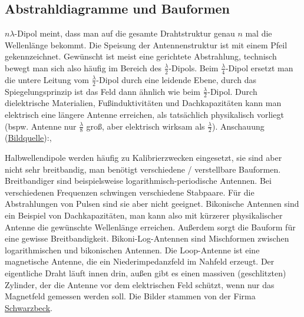  \subsection{Abstrahldiagramme und Bauformen}
  $n\lambda$-Dipol meint, dass man auf die gesamte Drahtstruktur genau $n$ mal die Wellenlänge bekommt. Die Speisung der Antennenstruktur ist mit einem Pfeil gekennzeichnet. Gewünscht ist meist eine gerichtete Abstrahlung, technisch bewegt man sich also häufig im Bereich des $\frac{\lambda}{2}$-Dipols. Beim $\frac{\lambda}{4}$-Dipol ersetzt man die untere Leitung vom $\frac{\lambda}{2}$-Dipol durch eine leidende Ebene, durch das Spiegelungsprinzip ist das Feld dann ähnlich wie beim $\frac{\lambda}{2}$-Dipol. Durch dielektrische Materialien, Fußinduktivitäten und Dachkapazitäten kann man elektrisch eine längere Antenne erreichen, als tatsächlich physikalisch vorliegt (bspw. Antenne nur $\frac{\lambda}{8}$ groß, aber elektrisch wirksam als $\frac{\lambda}{2}$). Anschauung (\href{https://commons.wikimedia.org/wiki/File:Lineare_antennen2.svg}{Bildquelle}):,
	  \begin{center}
		  \resizebox{.6\textwidth}{!}{}
		  	  \end{center}
		  	  Halbwellendipole werden häufig zu Kalibrierzwecken eingesetzt, sie sind aber nicht sehr breitbandig, man benötigt verschiedene / verstellbare Bauformen. Breitbandiger sind beispielsweise logarithmisch-periodische Antennen. Bei verschiedenen Frequenzen schwingen verschiedene Stabpaare. Für die Abstrahlungen von Pulsen sind sie aber nicht geeignet. Bikonische Antennen sind ein Beispiel von Dachkapazitäten, man kann also mit kürzerer physikalischer Antenne die gewünschte Wellenlänge erreichen. Außerdem sorgt die Bauform für eine gewisse Breitbandigkeit. Bikoni-Log-Antennen sind Mischformen zwischen logarithmischen und bikonischen Antennen. Die Loop-Antenne ist eine magnetische Antenne, die ein Niederimpedanzfeld im Nahfeld erzeugt. Der eigentliche Draht läuft innen drin, außen gibt es einen massiven (geschlitzten) Zylinder, der die Antenne vor dem elektrischen Feld schützt, wenn nur das Magnetfeld gemessen werden soll. Die Bilder stammen von der Firma \href{https://www.schwarzbeck.de/}{Schwarzbeck}.
		  	  \begin{center}
		  \resizebox{.6\textwidth}{!}{}
	  \end{center}


